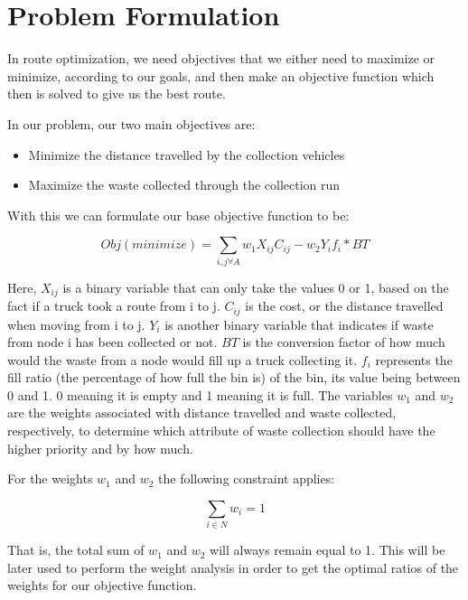 \documentclass[12pt]{article}
\begin{document}
\section{Problem Formulation}

In route optimization, we need objectives that we either need to maximize or minimize, according to our goals, and then make an objective function which then is solved to give us the best route. 

In our problem, our two main objectives are:
\begin{itemize}
    \item Minimize the distance travelled by the collection vehicles
    \item Maximize the waste collected through the collection run
\end{itemize}

With this we can formulate our base objective function to be:

\begin{equation}\label{eq1}
    Obj(minimize)=\sum_{i,j \forall A} w_1 X_{ij} C_{ij} - w_2 Y_i f_i * BT
\end{equation}

Here, $X_{ij}$ is a binary variable that can only take the values 0 or 1, based on the fact if a truck took a route from i to j. $C_{ij}$ is the cost, or the distance travelled when moving from i to j. $Y_{i}$ is another binary variable that indicates if waste from node i has been collected or not. $BT$ is the conversion factor of how much would the waste from a node would fill up a truck collecting it. $f_i$ represents the fill ratio (the percentage of how full the bin is) of the bin, its value being between 0 and 1. 0 meaning it is empty and 1 meaning it is full. The variables $w_1$ and $w_2$ are the weights associated with distance travelled and waste collected, respectively, to determine which attribute of waste collection should have the higher priority and by how much.

For the weights $w_1$ and $w_2$ the following constraint applies:

\begin{equation}\label{eq1.5}
    \sum_{i\in N} w_i = 1
\end{equation}

That is, the total sum of $w_1$ and $w_2$ will always remain equal to 1. This will be later used to perform the weight analysis in order to get the optimal ratios of the weights for our objective function.
\end{document}
